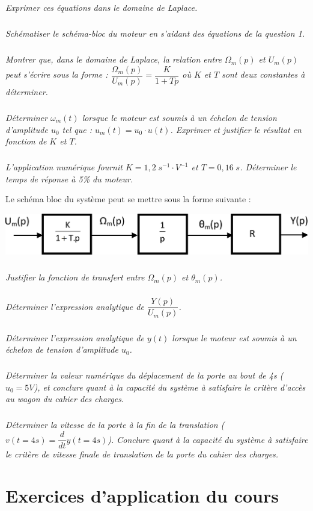 \documentclass[10pt,fleqn]{article} %
\begin{document}
\begin{multicols}{2}
\subparagraph{}
\textit{Exprimer ces équations dans le domaine de Laplace.}

\subparagraph{}
\textit{Schématiser le schéma-bloc du moteur en s’aidant des équations de la question 1.}

\subparagraph{}
\textit{Montrer que, dans le domaine de Laplace, la relation entre $\Omega_m (p)$ et $U_m (p)$ peut s'écrire sous la forme : $\dfrac{\Omega_m(p)}{U_m(p)} = \dfrac{K}{1+Tp} $ où $K$ et $T$ sont deux constantes à déterminer.}

\subparagraph{}
\textit{Déterminer $\omega_m (t)$ lorsque le moteur est soumis à un échelon de tension d'amplitude $u_0$ tel que : $u_m (t)= u_0 \cdot u(t)$. Exprimer et justifier le résultat en fonction de $K$ et $T$.}

\subparagraph{}
\textit{L'application numérique fournit $K=1,2 \; s^{-1}\cdot V^{-1}$ et $T=0,16\;s$. Déterminer le temps de réponse à 5\% du moteur.}

 Le schéma bloc du système peut se mettre sous la forme suivante :

 \begin{center}
\includegraphics[width=\linewidth]{images/fig_04}
\end{center} 

\subparagraph{}
\textit{Justifier la fonction de transfert entre $\Omega_m(p)$ et $\theta_m (p)$.}  

\subparagraph{}
\textit{Déterminer l'expression analytique de $\dfrac{Y(p)}{U_m(p)}$.}

\subparagraph{}
\textit{Déterminer l'expression analytique de $y(t)$ lorsque le moteur est soumis à un échelon de tension d'amplitude $u_0$.}  

\subparagraph{}
\textit{Déterminer la valeur numérique du déplacement de la porte au bout de 4s ($u_0 =5V$), et conclure quant à la capacité du système à satisfaire le critère d'accès au wagon du cahier des charges.}

\subparagraph{}
\textit{Déterminer la vitesse de la porte à la fin de la translation ($v(t=4s)= \dfrac{d}{dt}y(t=4s)$). Conclure quant à la capacité du système à satisfaire le critère de vitesse finale de translation de la porte du cahier des charges. }

\section*{Exercices d'application du cours}

\end{multicols}
\end{document}
